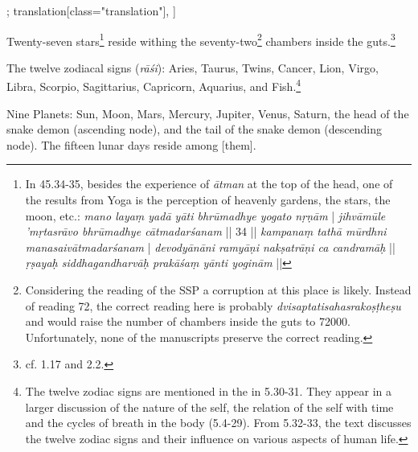 \begin{alignment}[
  texts=edition[class="edition"];
  translation[class="translation"],
  ]
\begin{translation}
\begin{tlate}[p41_01]
Twenty-seven stars\footnote{In  45.34-35, besides the experience of \textit{ātman} at the top of the head, one of the results from Yoga is the perception of heavenly gardens, the stars, the moon, etc.: \textit{mano layaṃ yadā yāti bhrūmadhye yogato nṛṇām} | \textit{jihvāmūle 'mṛtasrāvo bhrūmadhye cātmadarśanam} || 34 || \textit{kampanaṃ tathā mūrdhni manasaivātmadarśanam} | \textit{devodyānāni ramyāṇi nakṣatrāṇi ca candramāḥ} || \textit{ṛṣayaḥ siddhagandharvāḥ prakāśaṃ yānti yoginām} ||} reside withing the seventy-two\footnote{Considering the reading of the SSP a corruption at this place is likely. Instead of reading 72, the correct reading here is probably \textit{dvisaptatisahasrakoṣṭheṣu} and would raise the number of chambers inside the guts to 72000. Unfortunately, none of the manuscripts preserve the correct reading.} chambers inside the guts.\footnote{cf.  1.17 and  2.2.}

The twelve zodiacal signs (\textit{rāśi}): Aries, Taurus, Twins, Cancer, Lion, Virgo, Libra, Scorpio, Sagittarius, Capricorn, Aquarius, and Fish.\footnote{The twelve zodiac signs are mentioned in the  in 5.30-31. They appear in a larger discussion of the nature of the self, the relation of the self with time and the cycles of breath in the body (5.4-29). From 5.32-33, the text discusses the twelve zodiac signs and their influence on various aspects of human life.} 

Nine Planets: Sun, Moon, Mars, Mercury, Jupiter, Venus, Saturn, the head of the snake demon (ascending node), and the tail of the snake demon (descending node). The fifteen lunar days reside among [them].


\end{tlate}
\end{translation}
\end{alignment}
